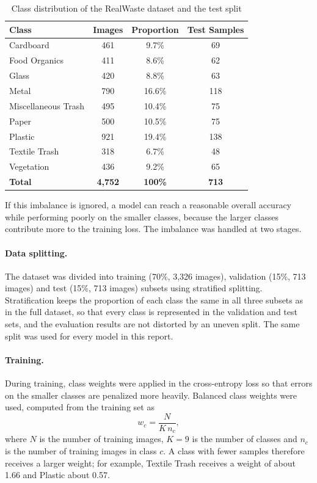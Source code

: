 \documentclass[12pt,a4paper]{article}
\begin{document}
\begin{table}[H]
\centering
\caption{Class distribution of the RealWaste dataset and the test split}
\label{tab:class_distribution}
\begin{tabular}{lccc}
\hline
\textbf{Class} & \textbf{Images} & \textbf{Proportion} & \textbf{Test Samples} \\
\hline
Cardboard & 461 & 9.7\% & 69 \\
Food Organics & 411 & 8.6\% & 62 \\
Glass & 420 & 8.8\% & 63 \\
Metal & 790 & 16.6\% & 118 \\
Miscellaneous Trash & 495 & 10.4\% & 75 \\
Paper & 500 & 10.5\% & 75 \\
Plastic & 921 & 19.4\% & 138 \\
Textile Trash & 318 & 6.7\% & 48 \\
Vegetation & 436 & 9.2\% & 65 \\
\hline
\textbf{Total} & \textbf{4,752} & \textbf{100\%} & \textbf{713} \\
\hline
\end{tabular}
\end{table}

If this imbalance is ignored, a model can reach a reasonable overall
accuracy while performing poorly on the smaller classes, because the
larger classes contribute more to the training loss. The imbalance was
handled at two stages.

\paragraph{Data splitting.} The dataset was divided into training
(70\%, 3,326 images), validation (15\%, 713 images) and test (15\%,
713 images) subsets using stratified splitting. Stratification keeps the
proportion of each class the same in all three subsets as in the full
dataset, so that every class is represented in the validation and test
sets, and the evaluation results are not distorted by an uneven split.
The same split was used for every model in this report.

\paragraph{Training.} During training, class weights were applied in the
cross-entropy loss so that errors on the smaller classes are penalized
more heavily. Balanced class weights were used, computed from the
training set as
\begin{equation}
w_c = \frac{N}{K\,n_c},
\end{equation}
where $N$ is the number of training images, $K=9$ is the number of
classes and $n_c$ is the number of training images in class $c$. A class
with fewer samples therefore receives a larger weight; for example,
Textile Trash receives a weight of about 1.66 and Plastic about 0.57.
\end{document}
